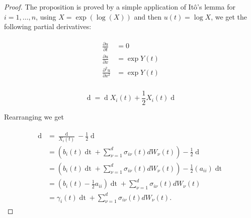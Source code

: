 \documentclass[british]{amsart} \usepackage{lmodern}
\numberwithin{equation}{section} \numberwithin{figure}{section}
\theoremstyle{plain} \newtheorem{thm}{\protect\theoremname}[section]
\theoremstyle{definition} \newtheorem{defn}[thm]{\protect\definitionname}
\theoremstyle{plain} \newtheorem{assumption}[thm]{\protect\assumptionname}
\theoremstyle{plain} \newtheorem{lem}[thm]{\protect\lemmaname}
\theoremstyle{plain} \newtheorem{prop}[thm]{\protect\propositionname}
\theoremstyle{remark} \newtheorem{rem}[thm]{\protect\remarkname}
\theoremstyle{plain} \newtheorem{cor}[thm]{\protect\corollaryname}
\renewcommand{\d}[1]{\mathop{\mathrm{d}{#1}}}
\newcommand{\rangei}{i=1,\dots,n} \newcommand{\measure}{\mathbb{P}}
\begin{document}
\begin{proof}

  The proposition is proved by a simple application of It\^{o}'s lemma for
  $\rangei$, using $X = \exp(\log(X))$ and then $u(t) = \log{X}$, we get 
  the following partial derivatives:

  \begin{gather*}
    \begin{split}
      \frac{\partial u}{\partial t} &= 0 \\
      \frac{\partial u}{\partial x} &= \exp{Y(t)}  \\
      \frac{\partial^2 u}{\partial x^2} &= \exp{Y(t)}  \\
    \end{split}
  \end{gather*}

  \begin{equation*}
      \d{X_{i}(t)} = \d{\log{X_{i}(t)}} X_{i}(t) 
          + \frac{1}{2} X_{i}(t) \d{ \langle \log{X_{i}} \rangle_{t} } 
  \end{equation*}

  Rearranging we get

  \begin{gather*}
    \begin{split}
      \d{\log{X_{i}(t)}} &= \frac{\d{X_{i}(t)}}{X_{i}(t)} 
          - \frac{1}{2} \d{ \langle \log{X_{i}} \rangle_{t} } \\
        &= \left( b_{i}(t)\d{t} + \sum_{\nu=1}^{d} \sigma_{i\nu}(t) dW_{\nu}(t) \right)
          - \frac{1}{2} \d{ \langle \log{X_{i}} \rangle_{t} } \\
        &= \left( b_{i}(t)\d{t} + \sum_{\nu=1}^{d} \sigma_{i\nu}(t) dW_{\nu}(t) \right)
          - \frac{1}{2} \left( a_{ii} \right)\d{t} \\
        &= \left( b_{i}(t) - \frac{1}{2}  a_{ii} \right)\d{t}  
          + \sum_{\nu=1}^{d} \sigma_{i\nu}(t) dW_{\nu}(t) \\
        &= \gamma_{i}(t) \d{t}  + \sum_{\nu=1}^{d} \sigma_{i\nu}(t) dW_{\nu}(t ).
    \end{split}
  \end{gather*}

\end{proof}
\end{document}
